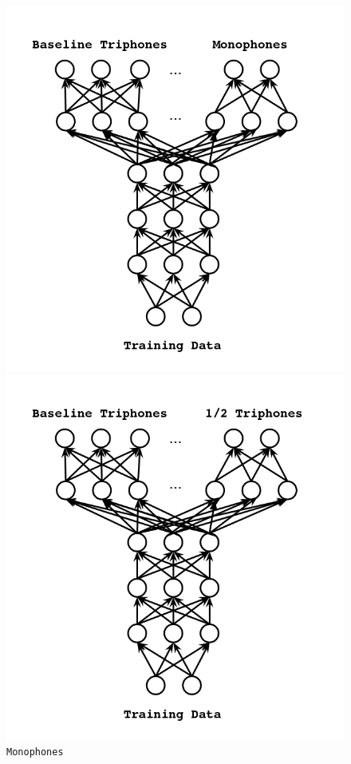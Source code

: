 \documentclass[10pt,a4paper]{article}
\begin{document}
\begin{enumerate}
\begin{figure}[!htb]
  \includegraphics[width=\linewidth]{figs/mtl-arch-mono.png}
  \caption{\texttt{Monophones}}
\endminipage\hfill
{}
  \includegraphics[width=\linewidth]{figs/mtl-arch-halfTri.png}

\end{figure}
\end{enumerate}
\end{document}
